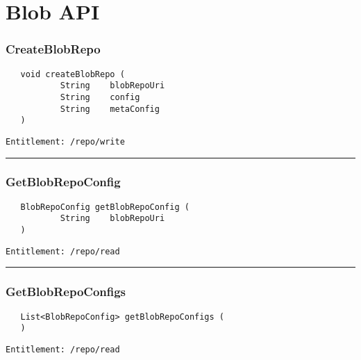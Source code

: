 \chapter{Blob API}

\subsection{CreateBlobRepo}
\label{Api:CreateBlobRepo}
\begin{verbatim}
   void createBlobRepo (
           String    blobRepoUri
           String    config
           String    metaConfig
   )
\end{verbatim}
\begin{Verbatim}[fontsize=\small, formatcom=\color{Maroon}]
  Entitlement: /repo/write
\end{Verbatim}



\rule{12cm}{2pt}
\subsection{GetBlobRepoConfig}
\label{Api:GetBlobRepoConfig}
\begin{verbatim}
   BlobRepoConfig getBlobRepoConfig (
           String    blobRepoUri
   )
\end{verbatim}
\begin{Verbatim}[fontsize=\small, formatcom=\color{Maroon}]
  Entitlement: /repo/read
\end{Verbatim}



\rule{12cm}{2pt}
\subsection{GetBlobRepoConfigs}
\label{Api:GetBlobRepoConfigs}
\begin{verbatim}
   List<BlobRepoConfig> getBlobRepoConfigs (
   )
\end{verbatim}
\begin{Verbatim}[fontsize=\small, formatcom=\color{Maroon}]
  Entitlement: /repo/read
\end{Verbatim}



